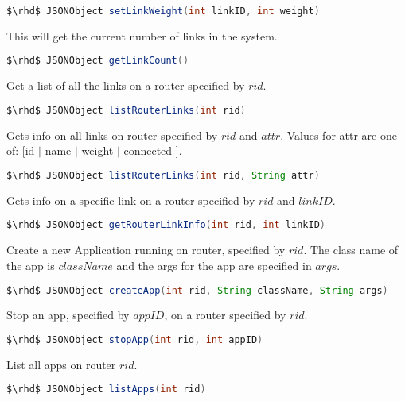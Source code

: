 \begin{lstlisting}[language=Java]
    $\rhd$ JSONObject setLinkWeight(int linkID, int weight)
\end{lstlisting}

\noindent  This will get the current number of links in the system.

\begin{lstlisting}[language=Java]
    $\rhd$ JSONObject getLinkCount()
\end{lstlisting}

\noindent  Get a list of all the links on a router specified by $rid$.

\begin{lstlisting}[language=Java]
    $\rhd$ JSONObject listRouterLinks(int rid)
\end{lstlisting}

\noindent  Gets info on all links on router specified by $rid$ and
$attr$. Values for attr are one of: [id $|$ name $|$ weight $|$ connected ].

\begin{lstlisting}[language=Java]
    $\rhd$ JSONObject listRouterLinks(int rid, String attr)
\end{lstlisting}

\noindent  Gets info on a specific link on a router specified by $rid$
and $linkID$.

\begin{lstlisting}[language=Java]
    $\rhd$ JSONObject getRouterLinkInfo(int rid, int linkID)
\end{lstlisting}

\noindent  Create a new Application running on router, specified by
$rid$.  The class name of the app is $className$ and the args for the
app are specified in $args$.

\begin{lstlisting}[language=Java]
    $\rhd$ JSONObject createApp(int rid, String className, String args)
\end{lstlisting}

\noindent  Stop an app, specified by $appID$, on a router specified by $rid$.

\begin{lstlisting}[language=Java]
    $\rhd$ JSONObject stopApp(int rid, int appID)
\end{lstlisting}

\noindent  List all apps on router $rid$.

\begin{lstlisting}[language=Java]
    $\rhd$ JSONObject listApps(int rid)
\end{lstlisting}

